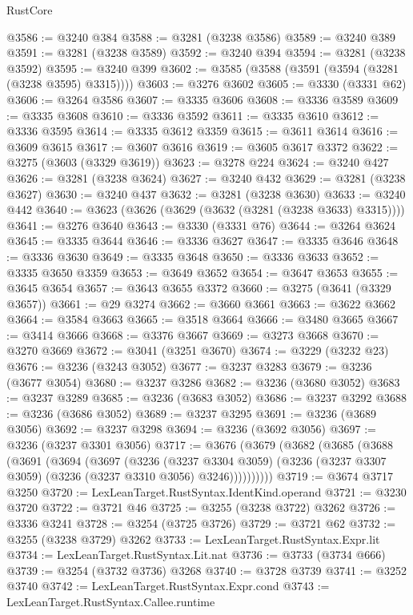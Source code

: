 \begin{lexlean}{RustCore}
\begin{coremodule}
@3586 := @3240 @384
@3588 := @3281 (@3238 @3586)
@3589 := @3240 @389
@3591 := @3281 (@3238 @3589)
@3592 := @3240 @394
@3594 := @3281 (@3238 @3592)
@3595 := @3240 @399
@3602 := @3585 (@3588 (@3591 (@3594 (@3281 (@3238 @3595) @3315))))
@3603 := @3276 @3602
@3605 := @3330 (@3331 @62)
@3606 := @3264 @3586
@3607 := @3335 @3606
@3608 := @3336 @3589
@3609 := @3335 @3608
@3610 := @3336 @3592
@3611 := @3335 @3610
@3612 := @3336 @3595
@3614 := @3335 @3612 @3359
@3615 := @3611 @3614
@3616 := @3609 @3615
@3617 := @3607 @3616
@3619 := @3605 @3617 @3372
@3622 := @3275 (@3603 (@3329 @3619))
@3623 := @3278 @224
@3624 := @3240 @427
@3626 := @3281 (@3238 @3624)
@3627 := @3240 @432
@3629 := @3281 (@3238 @3627)
@3630 := @3240 @437
@3632 := @3281 (@3238 @3630)
@3633 := @3240 @442
@3640 := @3623 (@3626 (@3629 (@3632 (@3281 (@3238 @3633) @3315))))
@3641 := @3276 @3640
@3643 := @3330 (@3331 @76)
@3644 := @3264 @3624
@3645 := @3335 @3644
@3646 := @3336 @3627
@3647 := @3335 @3646
@3648 := @3336 @3630
@3649 := @3335 @3648
@3650 := @3336 @3633
@3652 := @3335 @3650 @3359
@3653 := @3649 @3652
@3654 := @3647 @3653
@3655 := @3645 @3654
@3657 := @3643 @3655 @3372
@3660 := @3275 (@3641 (@3329 @3657))
@3661 := @29 @3274
@3662 := @3660 @3661
@3663 := @3622 @3662
@3664 := @3584 @3663
@3665 := @3518 @3664
@3666 := @3480 @3665
@3667 := @3414 @3666
@3668 := @3376 @3667
@3669 := @3273 @3668
@3670 := @3270 @3669
@3672 := @3041 (@3251 @3670)
@3674 := @3229 (@3232 @23)
@3676 := @3236 (@3243 @3052)
@3677 := @3237 @3283
@3679 := @3236 (@3677 @3054)
@3680 := @3237 @3286
@3682 := @3236 (@3680 @3052)
@3683 := @3237 @3289
@3685 := @3236 (@3683 @3052)
@3686 := @3237 @3292
@3688 := @3236 (@3686 @3052)
@3689 := @3237 @3295
@3691 := @3236 (@3689 @3056)
@3692 := @3237 @3298
@3694 := @3236 (@3692 @3056)
@3697 := @3236 (@3237 @3301 @3056)
@3717 := @3676
    (@3679
      (@3682
        (@3685
          (@3688
            (@3691
              (@3694
                (@3697
                  (@3236
                    (@3237 @3304 @3059)
                    (@3236 (@3237 @3307 @3059) (@3236 (@3237 @3310 @3056) @3246))))))))))
@3719 := @3674 @3717 @3250
@3720 := LexLeanTarget.RustSyntax.IdentKind.operand
@3721 := @3230 @3720
@3722 := @3721 @46
@3725 := @3255 (@3238 @3722) @3262
@3726 := @3336 @3241
@3728 := @3254 (@3725 @3726)
@3729 := @3721 @62
@3732 := @3255 (@3238 @3729) @3262
@3733 := LexLeanTarget.RustSyntax.Expr.lit
@3734 := LexLeanTarget.RustSyntax.Lit.nat
@3736 := @3733 (@3734 @666)
@3739 := @3254 (@3732 @3736) @3268
@3740 := @3728 @3739
@3741 := @3252 @3740
@3742 := LexLeanTarget.RustSyntax.Expr.cond
@3743 := LexLeanTarget.RustSyntax.Callee.runtime

\end{coremodule}
\end{lexlean}
